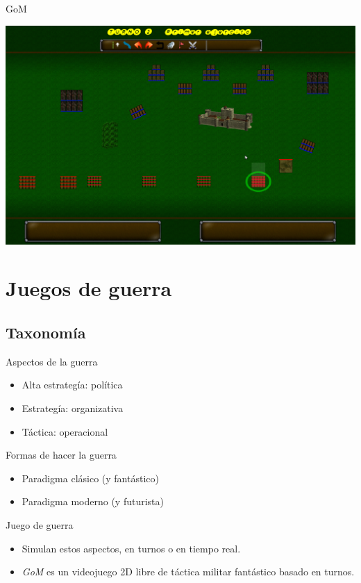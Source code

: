 \documentclass[green, compress]{beamer}
\begin{document}
\begin{frame}{GoM}
\begin{center}
\includegraphics[scale=.2]{imagenes/BatallaGoM.png}
\end{center}
\end{frame}

\section{Juegos de guerra}
\subsection{Taxonomía}
\begin{frame}
  \begin{block}{Aspectos de la guerra}
    \begin{itemize}
    \item Alta estrategía: política
    \item Estrategía: organizativa
    \item Táctica: operacional
    \end{itemize}
  \end{block}

  \begin{block}{Formas de hacer la guerra}
    \begin{itemize}
      \item Paradigma clásico (y fantástico)
      \item Paradigma moderno (y futurista)
    \end{itemize}
  \end{block}

  \begin{block}{Juego de guerra}
    \begin{itemize}
    \item Simulan estos aspectos, en turnos o en tiempo real.
    \item \textit{GoM} es un videojuego 2D libre de táctica militar fantástico
      basado en turnos.
    \end{itemize}
  \end{block}
\end{frame}
\end{document}
